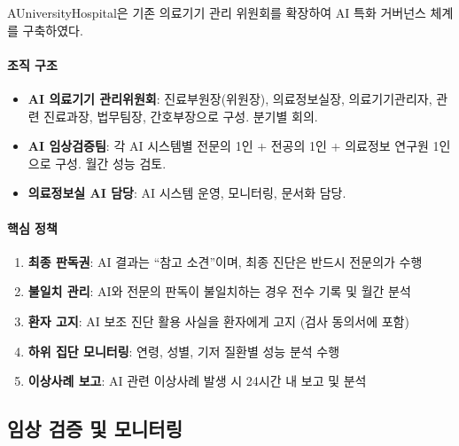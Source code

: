 AUniversityHospital은 기존 의료기기 관리 위원회를 확장하여 
AI 특화 거버넌스 체계를 구축하였다.

\paragraph{조직 구조}

\begin{itemize}
 \item \textbf{AI 의료기기 관리위원회}: 
 진료부원장(위원장), 의료정보실장, 의료기기관리자, 
 관련 진료과장, 법무팀장, 간호부장으로 구성. 분기별 회의.
 
 \item \textbf{AI 임상검증팀}: 
 각 AI 시스템별 전문의 1인 + 전공의 1인 + 의료정보 연구원 1인으로 구성. 
 월간 성능 검토.
 
 \item \textbf{의료정보실 AI 담당}: 
 AI 시스템 운영, 모니터링, 문서화 담당.
\end{itemize}

\paragraph{핵심 정책}

\begin{enumerate}
 \item \textbf{최종 판독권}: 
 AI 결과는 ``참고 소견''이며, 최종 진단은 반드시 전문의가 수행
 
 \item \textbf{불일치 관리}: 
 AI와 전문의 판독이 불일치하는 경우 전수 기록 및 월간 분석
 
 \item \textbf{환자 고지}: 
 AI 보조 진단 활용 사실을 환자에게 고지 (검사 동의서에 포함)
 
 \item \textbf{하위 집단 모니터링}: 
 연령, 성별, 기저 질환별 성능 분석 수행
 
 \item \textbf{이상사례 보고}: 
 AI 관련 이상사례 발생 시 24시간 내 보고 및 분석
\end{enumerate}


\subsection{임상 검증 및 모니터링}
\label{sec:7.2.3}

